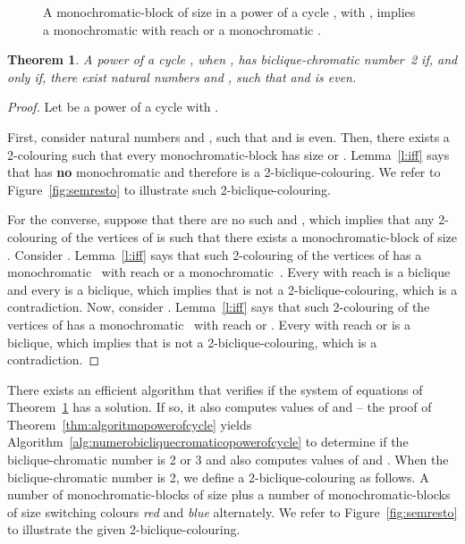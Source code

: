 \documentclass{article}
\newtheorem{theorem}{Theorem}
\begin{document}
\begin{figure}[t]
\centering
	\qquad
	\qquad
	\caption{A monochromatic-block of size  in a power of a cycle
	, with , implies a monochromatic  with reach
	 or a monochromatic .}
	\label{fig:catarinav2.2}
\end{figure}


\begin{theorem}
\label{thm:kappabpowerofcyclethirdinterval}
A power of a cycle , when , has biclique-chromatic
number~2 if, and only if, there exist natural numbers  and , such that  and  is even.
\end{theorem}

\begin{proof}
Let  be a power of a cycle  with .

First, consider natural numbers  and , such that  and  is even. Then, there exists a 2-colouring  such that every
monochromatic-block has size  or . Lemma~\ref{l:iff} says that  has 
\textbf{no} monochromatic  and therefore  is a 2-biclique-colouring.
We refer to Figure~\ref{fig:semresto} to illustrate such 2-biclique-colouring.

For the converse, suppose that there are no such  and , which implies
that any 2-colouring  of the vertices of  is such that there
exists a monochromatic-block of size . Consider . Lemma~\ref{l:iff} says that such 2-colouring of the vertices of  has
a monochromatic~ with reach  or a monochromatic~. Every
 with reach  is a biclique and every  is a biclique, which
implies that  is not a 2-biclique-colouring, which is a contradiction.
Now, consider . Lemma~\ref{l:iff} says that such 2-colouring of
the vertices of  has a monochromatic~ with reach  or . Every
 with reach  or  is a  biclique, which implies that
 is not a 2-biclique-colouring, which is a contradiction.
\end{proof}

 There exists an efficient algorithm that verifies if the system of equations of
 Theorem~\ref{thm:kappabpowerofcyclethirdinterval} has a solution. If so,
 it also computes values of  and  -- the proof of
 Theorem~\ref{thm:algoritmopowerofcycle} yields
 Algorithm~\ref{alg:numerobicliquecromaticopowerofcycle} to determine if the
 biclique-chromatic number is 2 or 3 and also computes values of  and .
 When the biclique-chromatic number is 2, we define a 2-biclique-colouring
  as follows. A number  of monochromatic-blocks
 of size  plus a number  of monochromatic-blocks of size  switching
 colours \emph{red} and \emph{blue} alternately. We refer to
 Figure~\ref{fig:semresto} to illustrate the given 2-biclique-colouring. 
\end{document}
